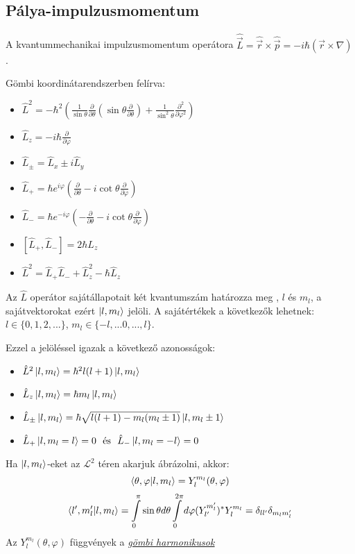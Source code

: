 \documentclass[12pt]{article}
\theoremstyle{plain}
\newcommand{\ndurl}[2]{\textit{\href{#1}{\underline{#2}}}}
\newcommand{\commut}[2]{\left [ #1 , #2 \right]}
\begin{document}
\subsection{Pálya-impulzusmomentum}
A kvantummechanikai impulzusmomentum operátora $\hat{\vec L} = \hat{\vec r} \times \hat{\vec p} = -i \hbar (\vec r \times \nabla)$.

Gömbi koordinátarendszerben felírva:
\begin{itemize}
    \item $
        \hat L^2 = -\hbar^2 \left(\frac{1}{\sin \theta} \frac{\partial}{\partial \theta} \left(\sin\theta\frac{\partial}{\partial \theta}\right) 
        + \frac{1}{\sin^2 \theta}\frac{\partial^2}{\partial\varphi^2}\right)
    $
    \item $
        \hat L_z = -i\hbar \frac{\partial}{\partial\varphi}
    $
    \item $
      \hat L_{\pm} = \hat L_x \pm i \hat L_y
    $
    \item $
        \hat L_+ = \hbar e^{i\varphi} \left( \frac{\partial}{\partial \theta} - i \cot\theta \frac{\partial}{\partial \varphi}\right)
    $
    \item $
        \hat L_- = \hbar e^{-i\varphi} \left( - \frac{\partial}{\partial \theta} - i \cot\theta \frac{\partial}{\partial \varphi}\right)
    $
    \item $
        \commut{\hat L_+}{\hat L_-} = 2 \hbar L_z
    $
    \item $
        \hat L^2 = \hat L_+ \hat L_- + \hat L_z^2 - \hbar \hat L_z
    $
\end{itemize}
Az $\hat L$ operátor sajátállapotait két kvantumszám határozza meg , $l$ és $m_l$, a sajátvektorokat ezért $\ket{l,m_l}$ jelöli.
A sajátértékek a következők lehetnek: $l\in \{0,1,2, ...\}$, $m_l \in \{-l,... 0, ..., l\}$.

Ezzel a jelöléssel igazak a következő azonosságok:
\begin{itemize}
    \item $
        \hat L^2 \ket{l, m_l} = \hbar^2 l (l+1) \ket{l,m_l}
    $
    \item $
        \hat L_z \ket{l, m_l} = \hbar m_l \ket{l,m_l}
    $
    \item $
      \hat L_{\pm}\ket{l, m_l} = \hbar \sqrt{l(l+1) - m_l(m_l\pm1)}\ket{l,m_l\pm 1}
    $
    \item $
        \hat L_+ \ket{l,m_l=l} = 0 ~~ \textrm{és} ~~ \hat L_- \ket{l,m_l=-l} = 0
    $
\end{itemize}
Ha $\ket{l,m_l}$-eket az $\mathcal{L}^2$ téren akarjuk ábrázolni, akkor:
\begin{equation}
    \braket{\theta, \varphi | l,m_l} = Y^{m_l}_l(\theta, \varphi)
\end{equation}
\begin{equation}
   \braket{l',m'_l|l,m_l} = \int \limits_0^{\pi}\sin\theta d \theta \int \limits_0^{2\pi}d \varphi (Y^{m_l'}_{l'})^{*} Y^{m_l}_l = \delta_{ll'}\delta_{m_lm_l'}
\end{equation}
Az $Y^{m_l}_l(\theta, \varphi)$ függvények a \ndurl{https://en.wikipedia.org/wiki/Spherical_harmonics}{gömbi harmonikusok}
\end{document}
